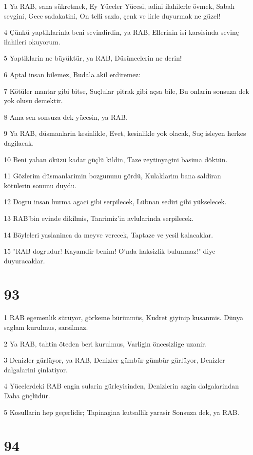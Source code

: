 \par 1 Ya RAB, sana sükretmek, Ey Yüceler Yücesi, adini ilahilerle övmek, Sabah sevgini, Gece sadakatini, On telli sazla, çenk ve lirle duyurmak ne güzel!
\par 4 Çünkü yaptiklarinla beni sevindirdin, ya RAB, Ellerinin isi karsisinda sevinç ilahileri okuyorum.
\par 5 Yaptiklarin ne büyüktür, ya RAB, Düsüncelerin ne derin!
\par 6 Aptal insan bilemez, Budala akil erdiremez:
\par 7 Kötüler mantar gibi bitse, Suçlular pitrak gibi açsa bile, Bu onlarin sonsuza dek yok olusu demektir.
\par 8 Ama sen sonsuza dek yücesin, ya RAB.
\par 9 Ya RAB, düsmanlarin kesinlikle, Evet, kesinlikle yok olacak, Suç isleyen herkes dagilacak.
\par 10 Beni yaban öküzü kadar güçlü kildin, Taze zeytinyagini basima döktün.
\par 11 Gözlerim düsmanlarimin bozgununu gördü, Kulaklarim bana saldiran kötülerin sonunu duydu.
\par 12 Dogru insan hurma agaci gibi serpilecek, Lübnan sediri gibi yükselecek.
\par 13 RAB'bin evinde dikilmis, Tanrimiz'in avlularinda serpilecek.
\par 14 Böyleleri yaslaninca da meyve verecek, Taptaze ve yesil kalacaklar.
\par 15 "RAB dogrudur! Kayamdir benim! O'nda haksizlik bulunmaz!" diye duyuracaklar.

\chapter{93}

\par 1 RAB egemenlik sürüyor, görkeme bürünmüs, Kudret giyinip kusanmis. Dünya saglam kurulmus, sarsilmaz.
\par 2 Ya RAB, tahtin öteden beri kurulmus, Varligin öncesizlige uzanir.
\par 3 Denizler gürlüyor, ya RAB, Denizler gümbür gümbür gürlüyor, Denizler dalgalarini çinlatiyor.
\par 4 Yücelerdeki RAB engin sularin gürleyisinden, Denizlerin azgin dalgalarindan Daha güçlüdür.
\par 5 Kosullarin hep geçerlidir; Tapinagina kutsallik yarasir Sonsuza dek, ya RAB.

\chapter{94}

